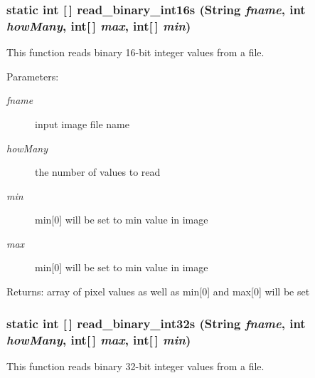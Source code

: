 \subsubsection{\setlength{\rightskip}{0pt plus 5cm}static int [$\,$] read\_\-binary\_\-int16s (String {\em fname}, int {\em how\-Many}, int[$\,$] {\em max}, int[$\,$] {\em min})\hspace{0.3cm}{\tt  [static, protected]}}\label{class_c_s_image_viewer_1_1pnm_helper_020e23c75bdf1f776395119067076565}


This function reads binary 16-bit integer values from a file. 

\begin{Desc}
\item[Parameters:]
\begin{description}
\item[{\em fname}]input image file name \item[{\em how\-Many}]the number of values to read \item[{\em min}]min[0] will be set to min value in image \item[{\em max}]min[0] will be set to min value in image\end{description}
\end{Desc}
\begin{Desc}
\item[Returns:]array of pixel values as well as min[0] and max[0] will be set \end{Desc}
\subsubsection{\setlength{\rightskip}{0pt plus 5cm}static int [$\,$] read\_\-binary\_\-int32s (String {\em fname}, int {\em how\-Many}, int[$\,$] {\em max}, int[$\,$] {\em min})\hspace{0.3cm}{\tt  [static, protected]}}\label{class_c_s_image_viewer_1_1pnm_helper_bd21c52e494d6dda7df0c988a5194651}


This function reads binary 32-bit integer values from a file. 

